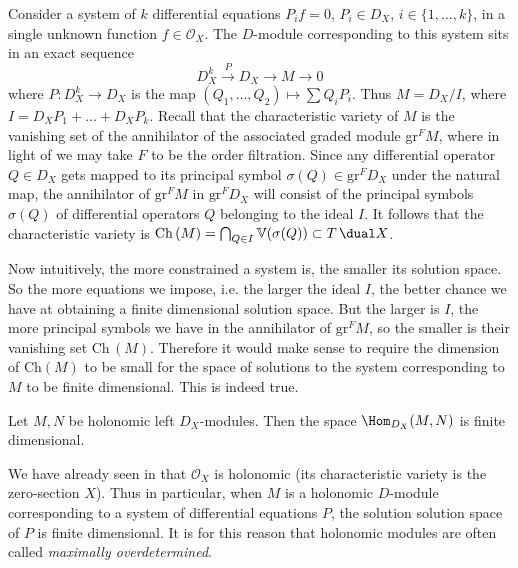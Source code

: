 Consider a system of $k$ differential equations $P_if=0$, $P_i\in D_X$,
$i\in\{1,\dots,k\}$, in a single unknown function $f\in \mathscr{O}_X$. The
$D$-module corresponding to this system sits in an exact sequence
\begin{equation*}
     D_X^k \overset{P}{\longrightarrow} D_X \longrightarrow M \longrightarrow 0
\end{equation*}
where $P : D_X^k\to D_X$ is the map $(Q_1,\dots,Q_2)\mapsto \sum Q_i P_i$. Thus
$M= D_X/ I$, where $I= D_X P_1 +\dots + D_X P_k$. Recall that the characteristic
variety of $M$ is the vanishing set of the annihilator of the associated graded
module gr$^F M$, where in light of  we may take $F$
to be the order filtration. Since any differential operator $Q\in
D_X$ gets mapped to its principal symbol $\sigma(Q)\in \text{gr}^FD_X$ under the
natural map, the annihilator of $\text{gr}^F M$ in $\text{gr}^F D_X$ will
consist of the principal symbols $\sigma(Q)$ of differential operators $Q$
belonging to the ideal $I$. It follows that the characteristic variety is
$\text{Ch}\,(M)=\bigcap_{Q\in I}\mathbb{V}(\sigma(Q))\subset T\,\dual X$. 

Now intuitively, the more constrained a system is, the smaller its solution
space. So the more equations we impose, i.e. the larger the ideal $I$, the
better chance we have at obtaining a finite dimensional solution space. But the
larger is $I$, the more principal symbols we have in the annihilator of
$\text{gr}^F M$, so the smaller is their vanishing set $\text{Ch}\,(M)$.
Therefore it would make sense to require the dimension of Ch$(M)$ to be small
for the space of solutions to the system corresponding to $M$ to be finite
dimensional. This is indeed true.

\begin{theorem}
    Let $M, N$ be holonomic left $D_X$-modules. Then the space $\Hom_{D_X}(M, N)$
    is finite dimensional.
\end{theorem}

We have already seen in  that \(\mathscr{O}_X\) is
holonomic (its characteristic variety is the zero-section \(X\)). Thus in
particular, when $M$ is a holonomic $D$-module corresponding to a system of
differential equations $P$, the solution solution space of $P$ is finite
dimensional. It is for this reason that holonomic modules are often called
\emph{maximally overdetermined}.
